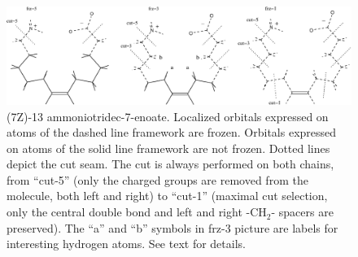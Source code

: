 \begin{figure}[h!]
\begin{center}
\includegraphics[width=12cm,keepaspectratio]{02_localization/images/7Z-frzcut-schema.eps}
\caption{\footnotesize (7Z)-13 ammoniotridec-7-enoate. Localized orbitals expressed on
atoms of the dashed line framework are frozen. Orbitals expressed on atoms
of the solid line framework are not frozen. Dotted lines depict the
cut seam. The cut is always performed on both chains, from ``cut-5'' (only
the charged groups are removed from the molecule, both left and right) to
``cut-1'' (maximal cut selection, only the central double bond and left and
right -CH$_{2}$- spacers are preserved). The ``a'' and ``b'' symbols in frz-3 picture
are labels for interesting hydrogen atoms. See text for details.  }
\label{fig:7Z-frzcut-schema}
\end{center}
\end{figure}
